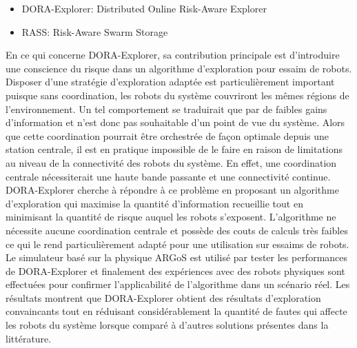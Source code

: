 \begin{itemize} 
\item DORA-Explorer: Distributed Online Risk-Aware Explorer
\item RASS: Risk-Aware Swarm Storage 
\end{itemize}

En ce qui concerne DORA-Explorer, sa contribution principale est d'introduire une conscience du risque dans un algorithme d'exploration pour essaim de robots. Disposer d'une stratégie d'exploration adaptée est particulièrement important puisque sans coordination, les robots du système couvriront les mêmes régions de l'environnement. Un tel comportement se traduirait que par de faibles gains d'information et n'est donc pas souhaitable d'un point de vue du système. Alors que cette coordination pourrait être orchestrée de façon optimale depuis une station centrale, il est en pratique impossible de le faire en raison de limitations au niveau de la connectivité des robots du système. En effet, une coordination centrale nécessiterait une haute bande passante et une connectivité continue. DORA-Explorer cherche à répondre à ce problème en proposant un algorithme d'exploration qui maximise la quantité d'information recueillie tout en minimisant la quantité de risque auquel les robots s'exposent. L'algorithme ne nécessite aucune coordination centrale et possède des couts de calculs très faibles ce qui le rend particulièrement adapté pour une utilisation sur essaims de robots. Le simulateur basé sur la physique ARGoS \cite{Pinciroli:SI2012} est utilisé par tester les performances de DORA-Explorer et finalement des expériences avec des robots physiques sont effectuées pour confirmer l'applicabilité de l’algorithme dans un scénario réel. Les résultats montrent que DORA-Explorer obtient des résultats d'exploration convaincants tout en réduisant considérablement la quantité de fautes qui affecte les robots du système lorsque comparé à d'autres solutions présentes dans la littérature.

